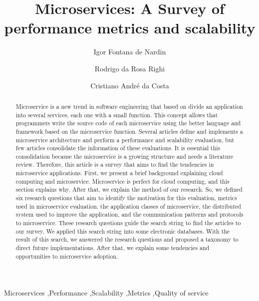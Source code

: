 \documentclass[final,5p,times,twocolumn]{elsarticle}
\begin{document}
\begin{frontmatter}

\title{Microservices: A Survey of performance metrics and scalability}

\author[Unisinos]{Igor Fontana de Nardin}

\author[Unisinos]{Rodrigo da Rosa Righi}

\author[Unisinos]{Cristiano André da Costa}


\address[Unisinos]{Universidade do vale do Rio dos Sinos, São Leopoldo, Brazil}

\begin{abstract}
Microservice is a new trend in software engineering that based on divide an application into several services, each one with a small function. This concept allows that programmers write the source code of each microservice using the better language and framework based on the microservice function. Several articles define and implements a microservice architecture and perform a performance and scalability evaluation, but few articles consolidate the information of these evaluations. It is essential this consolidation because the microservice is a growing structure and needs a literature review. Therefore, this article is a survey that aims to find the tendencies in microservice applications. First, we present a brief background explaining cloud computing and microservice. Microservice is perfect for cloud computing, and this section explains why. After that, we explain the method of our research. So, we defined six research questions that aim to identify the motivation for this evaluation, metrics used in microservice evaluation, the application classes of microservice, the distributed system used to improve the application, and the communication patterns and protocols to microservice. These research questions guide the search string to find the articles to our survey. We applied this search string into some electronic databases. With the result of this search, we answered the research questions and proposed a taxonomy to direct future implementations. After that, we explain some tendencies and opportunities to microservice adoption.
\end{abstract}

\begin {keyword}
Microservices \sep Performance \sep Scalability \sep Metrics \sep Quality of service
\end{keyword}

\end{frontmatter}
\end{document}
